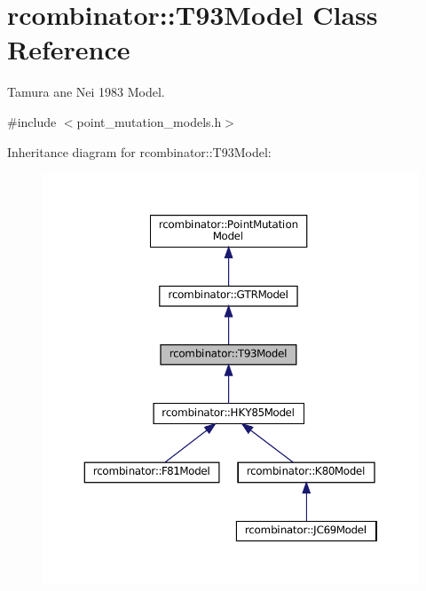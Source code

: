 \hypertarget{classrcombinator_1_1T93Model}{}\section{rcombinator\+:\+:T93\+Model Class Reference}
\label{classrcombinator_1_1T93Model}


Tamura ane Nei 1983 Model.  




{\ttfamily \#include $<$point\+\_\+mutation\+\_\+models.\+h$>$}



Inheritance diagram for rcombinator\+:\+:T93\+Model\+:\nopagebreak
\begin{figure}[H]
\begin{center}
\leavevmode
\includegraphics[width=350pt]{classrcombinator_1_1T93Model__inherit__graph}
\end{center}
\end{figure}


